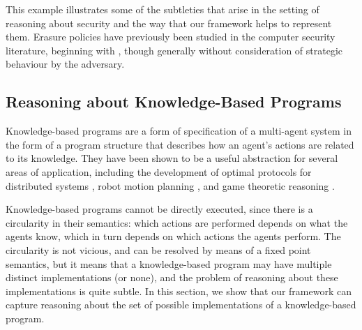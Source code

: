 \documentclass[a4wide]{article}
\theoremstyle{examplesty}
\begin{document}
This example illustrates some of the subtleties that arise in the 
setting of reasoning about security and the way that our framework helps to 
represent them. Erasure policies have previously been studied in the 
computer security literature, beginning with \cite{ChongM05}, though generally without 
consideration of strategic behaviour by the adversary. 



\subsection{Reasoning about Knowledge-Based Programs} \label{sec:KBP} 

Knowledge-based programs \cite{FHMV1997} are a form of specification 
of a multi-agent system in the form of a program structure that 
describes
how an agent's  actions are related to its knowledge. They have been
shown to be a useful abstraction for several areas of application, including
the development of optimal protocols for distributed systems \cite{FHMV1997}, 
robot motion planning \cite{BrafmanLMS1997}, and game theoretic reasoning \cite{HalpernMosesIJCAI}. 

Knowledge-based programs cannot be directly executed, since there is a circularity in their semantics: 
which actions are performed depends on what the agents know, which in turn 
depends on which actions the agents perform. The circularity is not
vicious, and can be resolved by means of a fixed point semantics, 
but it means that a  knowledge-based program may have multiple 
distinct implementations (or none), and the problem of reasoning about these implementations 
is quite subtle. In this section, we show that our framework can capture
reasoning about the set of possible implementations of a knowledge-based program.  


\newcommand{\did}{\mathit{did}} 
\end{document}
